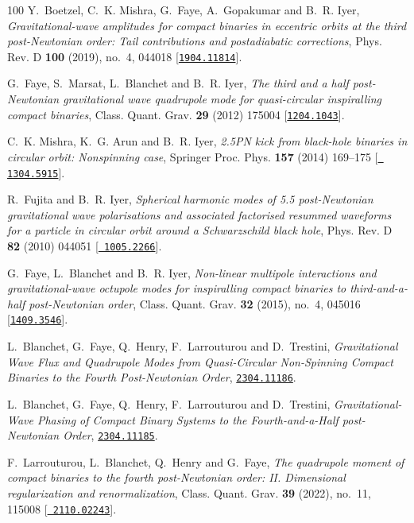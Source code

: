 \begin{thebibliography}{100}
Y.~Boetzel, C.~K. Mishra, G.~Faye, A.~Gopakumar and B.~R. Iyer,  {\em
  {Gravitational-wave amplitudes for compact binaries in eccentric orbits at
  the third post-Newtonian order: Tail contributions and postadiabatic
  corrections}}, Phys. Rev. D {\bf 100} (2019), no.~4, 044018
  [\href{http://www.arXiv.org/abs/1904.11814}{{\tt 1904.11814}}].

G.~Faye, S.~Marsat, L.~Blanchet and B.~R. Iyer,  {\em {The third and a half
  post-Newtonian gravitational wave quadrupole mode for quasi-circular
  inspiralling compact binaries}}, Class. Quant. Grav. {\bf 29} (2012) 175004
  [\href{http://www.arXiv.org/abs/1204.1043}{{\tt 1204.1043}}].

C.~K. Mishra, K.~G. Arun and B.~R. Iyer,  {\em {2.5PN kick from black-hole
  binaries in circular orbit: Nonspinning case}}, Springer Proc. Phys. {\bf
  157} (2014) 169--175 [\href{http://www.arXiv.org/abs/1304.5915}{{\tt
  1304.5915}}].

R.~Fujita and B.~R. Iyer,  {\em {Spherical harmonic modes of 5.5 post-Newtonian
  gravitational wave polarisations and associated factorised resummed waveforms
  for a particle in circular orbit around a Schwarzschild black hole}}, Phys.
  Rev. D {\bf 82} (2010) 044051 [\href{http://www.arXiv.org/abs/1005.2266}{{\tt
  1005.2266}}].

G.~Faye, L.~Blanchet and B.~R. Iyer,  {\em {Non-linear multipole interactions
  and gravitational-wave octupole modes for inspiralling compact binaries to
  third-and-a-half post-Newtonian order}}, Class. Quant. Grav. {\bf 32} (2015),
  no.~4, 045016 [\href{http://www.arXiv.org/abs/1409.3546}{{\tt 1409.3546}}].

L.~Blanchet, G.~Faye, Q.~Henry, F.~Larrouturou and D.~Trestini,  {\em
  {Gravitational Wave Flux and Quadrupole Modes from Quasi-Circular
  Non-Spinning Compact Binaries to the Fourth Post-Newtonian Order}},
  \href{http://www.arXiv.org/abs/2304.11186}{{\tt 2304.11186}}.

L.~Blanchet, G.~Faye, Q.~Henry, F.~Larrouturou and D.~Trestini,  {\em
  {Gravitational-Wave Phasing of Compact Binary Systems to the
  Fourth-and-a-Half post-Newtonian Order}},
  \href{http://www.arXiv.org/abs/2304.11185}{{\tt 2304.11185}}.

F.~Larrouturou, L.~Blanchet, Q.~Henry and G.~Faye,  {\em {The quadrupole moment
  of compact binaries to the fourth post-Newtonian order: II. Dimensional
  regularization and renormalization}}, Class. Quant. Grav. {\bf 39} (2022),
  no.~11, 115008 [\href{http://www.arXiv.org/abs/2110.02243}{{\tt
  2110.02243}}].


\end{thebibliography}
